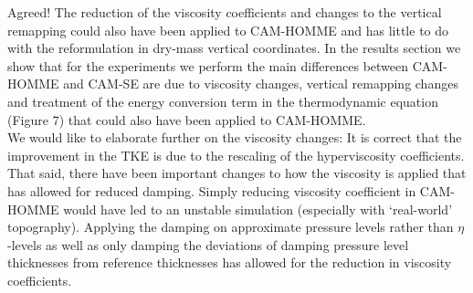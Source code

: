\documentclass[11pt]{article}
\begin{document}
Agreed! The reduction of the viscosity coefficients and changes to the vertical remapping could also have been applied to CAM-HOMME and has little to do with the reformulation in dry-mass vertical coordinates. In the results section we show that for the experiments we perform the main differences between CAM-HOMME and CAM-SE are due to viscosity changes, vertical remapping changes and treatment of the energy conversion term in the thermodynamic equation (Figure 7) that could also have been applied to CAM-HOMME.\\

We would like to elaborate further on the viscosity changes: It is correct that the improvement in the TKE is due to the rescaling of the hyperviscosity coefficients. That said, there have been important changes to how the viscosity is applied that has allowed for reduced damping. Simply reducing viscosity coefficient in CAM-HOMME would have led to an unstable simulation (especially with `real-world' topography). Applying the damping on approximate pressure levels rather than $\eta$-levels as well as only damping the deviations of damping pressure level thicknesses from reference thicknesses has allowed for the reduction in viscosity coefficients.\\
\end{document}

